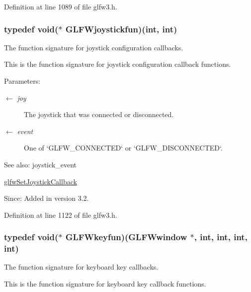 Definition at line 1089 of file glfw3.h.\hypertarget{group__input_g488fd02f577e56f908a8f305dd226dbf}{
\subsubsection[GLFWjoystickfun]{\setlength{\rightskip}{0pt plus 5cm}typedef void($\ast$  {\bf GLFWjoystickfun})(int, int)}}
\label{group__input_g488fd02f577e56f908a8f305dd226dbf}


The function signature for joystick configuration callbacks. 

This is the function signature for joystick configuration callback functions.

\begin{Desc}
\item[Parameters:]
\begin{description}
\item[\mbox{$\leftarrow$} {\em joy}]The joystick that was connected or disconnected. \item[\mbox{$\leftarrow$} {\em event}]One of `GLFW\_\-CONNECTED` or `GLFW\_\-DISCONNECTED`.\end{description}
\end{Desc}
\begin{Desc}
\item[See also:]joystick\_\-event 

\hyperlink{group__input_g07524a1122a03642b1d28822ea931094}{glfwSetJoystickCallback}\end{Desc}
\begin{Desc}
\item[Since:]Added in version 3.2. \end{Desc}


Definition at line 1122 of file glfw3.h.\hypertarget{group__input_g592dd1919f8a1dc7576b13cdd8b7b695}{
\subsubsection[GLFWkeyfun]{\setlength{\rightskip}{0pt plus 5cm}typedef void($\ast$  {\bf GLFWkeyfun})({\bf GLFWwindow} $\ast$, int, int, int, int)}}
\label{group__input_g592dd1919f8a1dc7576b13cdd8b7b695}


The function signature for keyboard key callbacks. 

This is the function signature for keyboard key callback functions.


